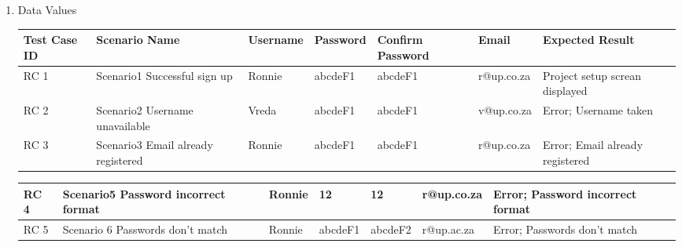 \documentclass[hidelinks, 12pt, oneside]{article}
\begin{document}
\begin{enumerate}
\item Data Values

\begin{center}
\begin{tabu}to 1.1\textwidth{|X[l]|X|X|X|X|X|X|} 
 \hline
 Test Case ID & Scenario Name & Username & Password & Confirm Password & Email & Expected Result \\ [0.1ex]
 \hline
  RC 1 & Scenario1 Successful sign up & Ronnie & abcdeF1 & abcdeF1 & r@up.co.za & Project setup screan displayed\\ [0.1ex]
 \hline
 RC 2 & Scenario2 Username unavailable & Vreda&abcdeF1&abcdeF1&v@up.co.za&Error; Username taken \\[0.1ex]
 \hline
  RC 3 & Scenario3 Email already registered &Ronnie&abcdeF1&abcdeF1&r@up.co.za&Error; Email already registered\\[0.1ex]
 \hline
\end{tabu}

\begin{tabu}to 1.1\textwidth{|X[l]|X|X|X|X|X|X|} 
 \hline
 RC 4 &  Scenario5 Password incorrect format & Ronnie&12&12&r@up.co.za&Error; Password incorrect format\\[0.1ex]
 \hline
 RC 5 &  Scenario 6 Passwords don't match & Ronnie&abcdeF1&abcdeF2&r@up.ac.za&Error; Passwords don't match  \\ [0.1ex]
 \hline
\end{tabu}
\end{center}

\end{enumerate}
\end{document}
